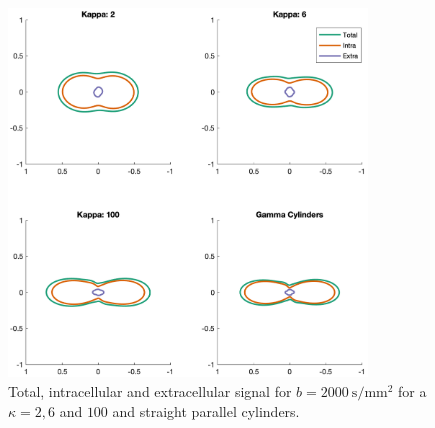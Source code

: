 \begin{figure}
  \centering
  \includegraphics[width=0.85\textwidth]{figures/frf_experiment/sig_sh_b2000}
  \caption[Extracellular signal fraction as a function of b-value]{Total, intracellular and extracellular signal for $b = \SI{2000}{\second\per\milli\metre\squared}$ for a $\kappa = 2, 6$ and $100$ and straight parallel cylinders. }
  \label{fig:frf_extra_sh}
\end{figure}

